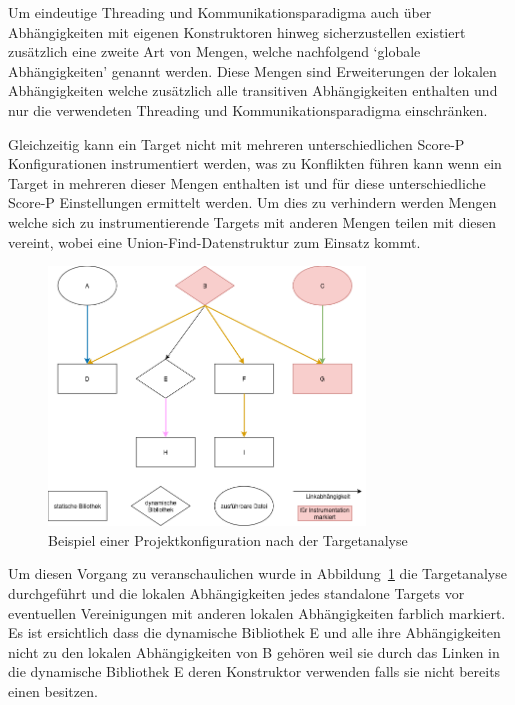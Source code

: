 \documentclass[german,proseminar,hyperref,utf8,lof]{zihpub}
\begin{document}
    Um eindeutige Threading und Kommunikationsparadigma auch über Abhängigkeiten mit eigenen
    Konstruktoren hinweg sicherzustellen existiert zusätzlich eine zweite Art von Mengen, welche
    nachfolgend `globale Abhängigkeiten' genannt werden.
    Diese Mengen sind Erweiterungen der lokalen Abhängigkeiten welche zusätzlich alle transitiven
    Abhängigkeiten enthalten und nur die verwendeten Threading und Kommunikationsparadigma einschränken.

    Gleichzeitig kann ein Target nicht mit mehreren unterschiedlichen Score-P Konfigurationen
    instrumentiert werden, was zu Konflikten führen kann wenn ein Target in mehreren dieser
    Mengen enthalten ist und für diese unterschiedliche Score-P Einstellungen ermittelt werden.
    Um dies zu verhindern werden Mengen welche sich zu instrumentierende Targets mit anderen
    Mengen teilen mit diesen vereint, wobei eine Union-Find-Datenstruktur zum Einsatz kommt.

    \begin{figure}
        \begin{center}
            \includegraphics[width=0.75\textwidth]{analysis_localsets.drawio.png}
            \caption{Beispiel einer Projektkonfiguration nach der Targetanalyse}
            \label{fig:analysis_localsets}
        \end{center}
    \end{figure}

    Um diesen Vorgang zu veranschaulichen wurde in Abbildung~\ref{fig:analysis_localsets} die
    Targetanalyse durchgeführt und die lokalen Abhängigkeiten jedes standalone Targets vor eventuellen
    Vereinigungen mit anderen lokalen Abhängigkeiten farblich markiert.
    Es ist ersichtlich dass die dynamische Bibliothek E und alle ihre Abhängigkeiten nicht zu den
    lokalen Abhängigkeiten von B gehören weil sie durch das Linken in die dynamische Bibliothek E
    deren Konstruktor verwenden falls sie nicht bereits einen besitzen.
\end{document}
